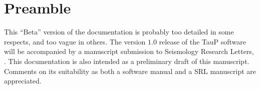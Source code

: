 
\section*{Preamble}

This ``Beta'' version of the documentation is probably too detailed in 
some respects, and too vague in others. The version $1.0$ release of the 
TauP software will be accompanied by a manuscript submission to 
Seismology Research Letters, \cite{taupsrl}. This documentation is 
also intended as a preliminary draft of this manuscript. Comments on 
its suitability as both a software manual and a SRL
manuscript are appreciated.
